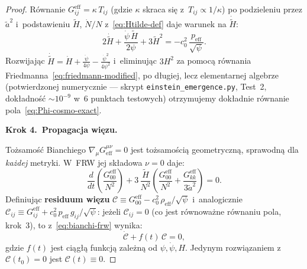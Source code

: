 \begin{proof}
R\'ownanie $G^{\mathrm{eff}}_{ij} = \kappa\,T_{ij}$
(gdzie $\kappa$ skraca si\k{e} z~$T_{ij} \propto 1/\kappa$)
po podzieleniu przez $\tilde a^2$ i~podstawieniu
$\tilde H$, $\dot N/N$ z~\eqref{eq:Htilde-def}
daje warunek na $\dot{\tilde H}$:
\begin{equation}\label{eq:acceleration-expanded}
  2\dot{\tilde H}
  + \frac{\dot\psi\,\tilde H}{2\psi}
  + 3\tilde H^2
  = -c_0^2\,\frac{p_{\mathrm{eff}}}{\sqrt\psi}.
\end{equation}
Rozwijaj\k{a}c
$\dot{\tilde H}
= \dot H + \frac{\ddot\psi}{4\psi}
- \frac{\dot\psi^2}{4\psi^2}$
i~eliminuj\k{a}c $3H^2$ za pomoc\k{a}
r\'ownania Friedmanna~\eqref{eq:friedmann-modified},
po d\l{}ugiej, lecz elementarnej algebrze
(potwierdzonej numerycznie --- skrypt
\texttt{einstein\_emergence.py}, Test~2,
dok\l{}adno\'s\'c $\sim\!10^{-9}$ w~6 punktach
testowych) otrzymujemy dok\l{}adnie
r\'ownanie pola~\eqref{eq:Phi-cosmo-exact}.

\medskip\noindent
\textbf{Krok 4.\ Propagacja wi\k{e}zu.}\nopagebreak

To\.zsamo\'s\'c Bianchiego $\nabla_\mu G^{\mu\nu}_{\mathrm{eff}} = 0$
jest to\.zsamo\'sci\k{a} geometryczn\k{a}, sprawodn\k{a} dla
\emph{ka\.zdej} metryki. W~FRW jej sk\l{}adowa $\nu = 0$ daje:
\begin{equation}\label{eq:bianchi-frw}
  \frac{d}{dt}\!\left(
    \frac{G^{\mathrm{eff}}_{00}}{N^2}
  \right)
  + 3\,\frac{\tilde H}{N^2}\!\left(
    \frac{G^{\mathrm{eff}}_{00}}{N^2}
    + \frac{G^{\mathrm{eff}}_{kk}}{3\tilde a^2}
  \right) = 0.
\end{equation}
Definiuj\k{a}c \textbf{residuum wi\k{e}zu}
$\mathcal{C} \equiv G^{\mathrm{eff}}_{00} - c_0^2\,\rho_{\mathrm{eff}}/\sqrt\psi$
i~analogicznie
$\mathcal{C}_{ij} \equiv G^{\mathrm{eff}}_{ij} + c_0^2\,p_{\mathrm{eff}}\,g_{ij}/\sqrt\psi$:
je\.zeli $\mathcal{C}_{ij} = 0$ (co jest r\'ownowa\.zne
r\'ownaniu pola, krok~3),
to z~\eqref{eq:bianchi-frw} wynika:
\begin{equation}\label{eq:constraint-propagation}
  \dot{\mathcal{C}} + f(t)\,\mathcal{C} = 0,
\end{equation}
gdzie $f(t)$ jest ci\k{a}g\l{}\k{a} funkcj\k{a} zale\.zn\k{a}
od $\psi, \dot\psi, H$. Jedynym rozwi\k{a}zaniem
z~$\mathcal{C}(t_0) = 0$ jest $\mathcal{C}(t) \equiv 0$.


\end{proof}
